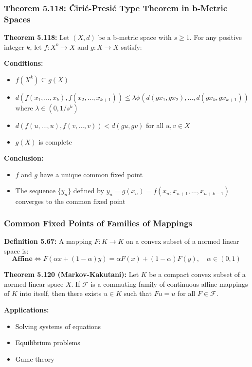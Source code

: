 \documentclass[aspectratio=169,10pt]{beamer}
\begin{document}
\begin{frame}
\frametitle{Theorem 5.118: Ćirić-Presić Type Theorem in b-Metric Spaces}

\textbf{Theorem 5.118:} Let $(X, d)$ be a b-metric space with $s \geq 1$.
For any positive integer $k$, let $f: X^k \to X$ and $g: X \to X$ satisfy:

\vspace{0.15cm}

\textbf{Conditions:}
\begin{itemize}
    \item[\textbf{(i)}] $f(X^k) \subseteq g(X)$

    \item[\textbf{(ii)}] $d(f(x_1, \ldots, x_k), f(x_2, \ldots, x_{k+1})) \leq \lambda \phi(d(gx_1, gx_2), \ldots, d(gx_k, gx_{k+1}))$
    \quad where $\lambda \in (0, 1/s^k)$

    \item[\textbf{(iii)}] $d(f(u,\ldots,u), f(v,\ldots,v)) < d(gu, gv)$ for all $u, v \in X$

    \item[\textbf{(iv)}] $g(X)$ is complete
\end{itemize}

\vspace{0.2cm}

\textbf{Conclusion:}
\begin{itemize}
    \item $f$ and $g$ have a unique common fixed point
    \item The sequence $\{y_n\}$ defined by $y_n = g(x_n) = f(x_n, x_{n+1}, \ldots, x_{n+k-1})$ converges to the common fixed point
\end{itemize}

\end{frame}

\begin{frame}
\frametitle{Common Fixed Points of Families of Mappings}

\textbf{Definition 5.67:} A mapping $F: K \to K$ on a convex subset of a normed linear space is:
$$\textbf{Affine} \iff F(\alpha x + (1-\alpha)y) = \alpha F(x) + (1-\alpha)F(y), \quad \alpha \in (0,1)$$

\vspace{0.3cm}

\textbf{Theorem 5.120 (Markov-Kakutani):} Let $K$ be a compact convex subset of a normed linear space $X$.
If $\mathcal{F}$ is a commuting family of continuous affine mappings of $K$ into itself, then there exists
$u \in K$ such that $Fu = u$ for all $F \in \mathcal{F}$.

\vspace{0.3cm}

\textbf{Applications:}
\begin{itemize}
    \item Solving systems of equations
    \item Equilibrium problems
    \item Game theory
\end{itemize}

\end{frame}
\end{document}
